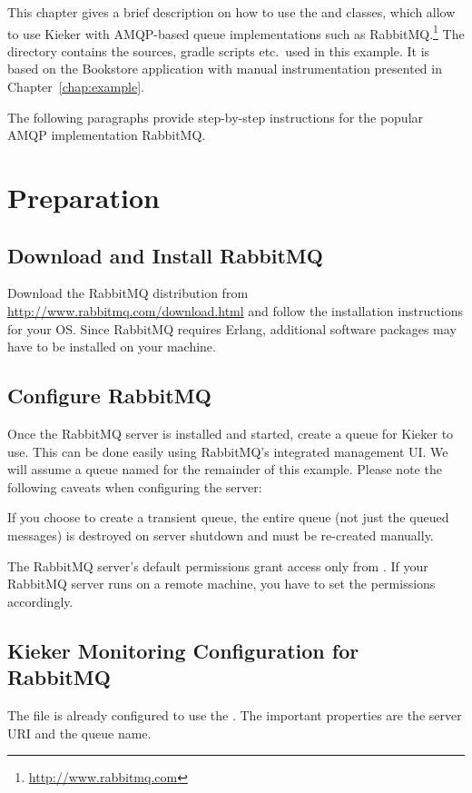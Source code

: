 This chapter gives a brief description on how to use the  and  %
classes, which allow to use Kieker with AMQP-based queue implementations such as %
RabbitMQ.\footnote{\url{http://www.rabbitmq.com}} The directory \dir{\AMQPBookstoreApplicationReleaseDirDistro/} %
contains the sources, gradle scripts etc.\ used in this example. It is based on the Bookstore %
application with manual instrumentation presented in Chapter~\ref{chap:example}. %

The following paragraphs provide step-by-step instructions for the popular AMQP implementation RabbitMQ.%

\section{Preparation}

\subsection{Download and Install RabbitMQ}
Download the RabbitMQ distribution from \url{http://www.rabbitmq.com/download.html} and follow the installation %
instructions for your OS. Since RabbitMQ requires Erlang, additional software packages may have to be installed %
on your machine. %

\subsection{Configure RabbitMQ}
Once the RabbitMQ server is installed and started, create a queue for Kieker to use. This can be done easily using %
RabbitMQ's integrated management UI. We will assume a queue named  for the remainder of this %
example. Please note the following caveats when configuring the server:

\begin{compactenum}
 \item If you choose to create a transient queue, the entire queue (not just the queued messages) is destroyed %
 on server shutdown and must be re-created manually. %
 \item The RabbitMQ server's default permissions grant access only from . If your RabbitMQ server runs %
 on a remote machine, you have to set the permissions accordingly. %
\end{compactenum}

\subsection{Kieker Monitoring Configuration for RabbitMQ}
The file  %
is already configured to use the . The important properties are %
the server URI and the queue name. %

